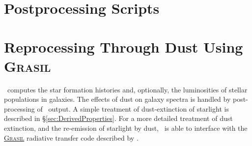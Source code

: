 \section{Postprocessing Scripts}\label{sec:PostProcessingScripts}

\section{Reprocessing Through Dust Using {\normalfont \scshape Grasil}}\label{sec:Grasil}

\glc\ computes the star formation histories and, optionally, the luminosities of stellar populations in galaxies. The effects of dust on galaxy spectra is handled by post-processing of \glc\ output. A simple treatment of dust-extinction of starlight is described in \S\ref{sec:DerivedProperties}. For a more detailed treatment of dust extinction, and the re-emission of starlight by dust, \glc\ is able to interface with the \href{http://adlibitum.oat.ts.astro.it/silva/grasil/grasil.html}{{\normalfont \scshape Grasil}} radiative transfer code described by \cite{silva_modeling_1998}.

